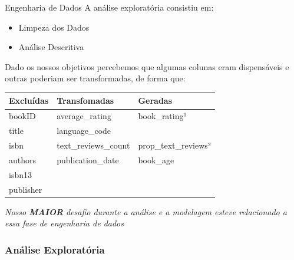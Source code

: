 \documentclass[
  9 pt,
  ignorenonframetext,
]{beamer}
\providecommand{\tightlist}{%
  \setlength{\itemsep}{0pt}\setlength{\parskip}{0pt}}
\begin{document}
\begin{frame}{Engenharia de Dados}
A análise exploratória consistiu em:

\begin{itemize}
\tightlist
\item
  Limpeza dos Dados
\item
  Análise Descritiva
\end{itemize}

Dado os nossos objetivos percebemos que algumas colunas eram
dispensáveis e outras poderiam ser transformadas, de forma que:

\begin{table}[H]
\centering
\begin{tabular}{lll}
\toprule
Excluídas & Transfomadas & Geradas\\
\midrule
bookID & average\_rating & book\_rating¹\\
title & language\_code & \\
isbn & text\_reviews\_count & prop\_text\_reviews²\\
authors & publication\_date & book\_age\\
isbn13 &  & \\
\addlinespace
publisher &  & \\
\bottomrule
\end{tabular}
\end{table}

\begin{block}{\emph{Nosso \textbf{MAIOR} desafio durante a análise e a
modelagem esteve relacionado a essa fase de engenharia de dados}}
\protect\hypertarget{nosso-maior-desafio-durante-a-anuxe1lise-e-a-modelagem-esteve-relacionado-a-essa-fase-de-engenharia-de-dados}{}
\end{block}
\end{frame}

\hypertarget{anuxe1lise-exploratuxf3ria}{%
\subsubsection{Análise Exploratória}\label{anuxe1lise-exploratuxf3ria}}
\end{document}
